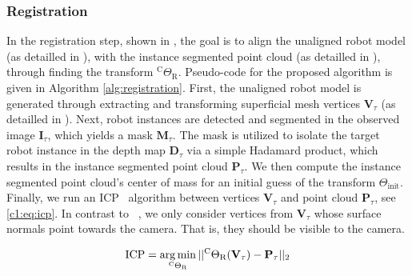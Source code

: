 \subsubsection{Registration}
\label{c1:sec:registration}
In the registration step, shown in , the goal is to align the unaligned robot model (as detailled in ), with the instance segmented point cloud (as detailled in ), through finding the transform $^\text{C}\Theta_\text{R}$. Pseudo-code for the proposed algorithm is given in Algorithm \ref{alg:registration}.
First, the unaligned robot model is generated through extracting and transforming superficial mesh vertices $\mathbf{V}_\tau$ (as detailled in ).
Next, robot instances are detected and segmented in the observed image $\mathbf{I}_\tau$, which yields a mask $\mathbf{M}_\tau$.
The mask is utilized to isolate the target robot instance in the depth map $\mathbf{D}_\tau$ via a simple Hadamard product, which results in the instance segmented point cloud $\mathbf{P}_\tau$.
We then compute the instance segmented point cloud's center of mass for an initial guess of the transform $\Theta_\text{init}$. Finally, we run an ICP~\citep{simple_icp} algorithm between vertices $\mathbf{V}_\tau$ and point cloud $\mathbf{P}_\tau$, see \eqref{c1:eq:icp}. In contrast to ~\citep{simple_icp}, we only consider vertices from $\mathbf{V}_\tau$ whose surface normals point towards the camera. That is, they should be visible to the camera.

\begin{equation}
    \label{c1:eq:icp}
    \text{ICP} = \argmin_{^\text{C}\Theta_\text{R}} || ^\text{C}\Theta_\text{R}(\mathbf{V}_\tau) - \mathbf{P}_\tau||_2
\end{equation}




